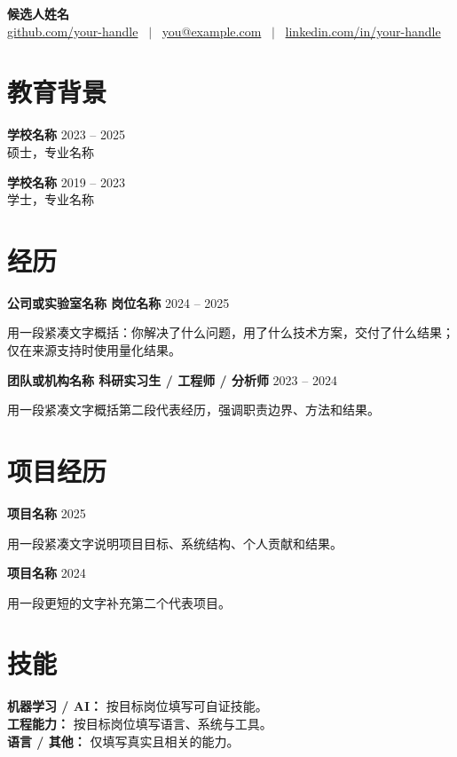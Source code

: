 \documentclass[UTF8,a4paper,10pt]{ctexart}
\newcommand{\cvneedspace}[1]{%
  \par\ifdim\dimexpr\pagegoal-\pagetotal\relax<#1\relax\newpage\fi
}
\newcommand{\cvsection}[1]{\cvneedspace{4\baselineskip}\section{#1}}
\begin{document}
\pagestyle{empty}

\begin{center}
  {\LARGE\bfseries 候选人姓名} \\[4pt]
  {\small
    \href{https://github.com/your-handle}{github.com/your-handle} \ $|$ \
    \href{mailto:you@example.com}{you@example.com} \ $|$ \
    \href{https://www.linkedin.com/in/your-handle}{linkedin.com/in/your-handle}
  }
\end{center}

\cvsection{教育背景}
\cvneedspace{3\baselineskip}
\textbf{学校名称} \hfill 2023 -- 2025 \\
硕士，专业名称

\cvneedspace{3\baselineskip}
\textbf{学校名称} \hfill 2019 -- 2023 \\
学士，专业名称

\cvsection{经历}
\cvneedspace{4\baselineskip}
\noindent\textbf{公司或实验室名称 \quad 岗位名称} \hfill 2024 -- 2025

{\small 用一段紧凑文字概括：你解决了什么问题，用了什么技术方案，交付了什么结果；仅在来源支持时使用量化结果。}

\vspace{3pt}
\cvneedspace{4\baselineskip}
\noindent\textbf{团队或机构名称 \quad 科研实习生 / 工程师 / 分析师} \hfill 2023 -- 2024

{\small 用一段紧凑文字概括第二段代表经历，强调职责边界、方法和结果。}

\cvsection{项目经历}
\cvneedspace{4\baselineskip}
\noindent\textbf{项目名称} \hfill 2025

{\small 用一段紧凑文字说明项目目标、系统结构、个人贡献和结果。}

\vspace{3pt}
\cvneedspace{4\baselineskip}
\noindent\textbf{项目名称} \hfill 2024

{\small 用一段更短的文字补充第二个代表项目。}

\cvsection{技能}
\textbf{机器学习 / AI：} 按目标岗位填写可自证技能。\\
\textbf{工程能力：} 按目标岗位填写语言、系统与工具。\\
\textbf{语言 / 其他：} 仅填写真实且相关的能力。
\end{document}
